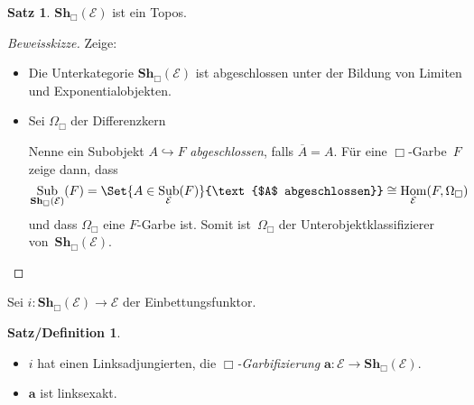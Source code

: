 \documentclass{article}
\theoremstyle{definition}
\newtheorem*{satz}{Satz}
\newtheorem*{satzdefn}{Satz/Definition}
\theoremstyle{remark}
\newcommand{\?}{\,{:}\,}
\renewcommand{\_}{\mathpunct{.}\,}
\DeclareMathOperator{\Hom}{Hom} %
\DeclareMathOperator{\id}{id} %
\DeclareMathOperator{\Sub}{Sub} %
\newcommand{\clos}[1]{\overline{{#1}}} %
\newcommand{\sheafification}{\mathbf{a}} %
\newcommand{\Sh}{\mathbf{Sh}} %
\newcommand{\Eat}{\mathcal{E}} %
\begin{document}
\begin{satz}
  $\Sh_\Box(\Eat)$ ist ein Topos.
\end{satz}

\begin{proof}[Beweisskizze]
  Zeige:
  \begin{itemize}
    \item Die Unterkategorie $\Sh_\Box(\Eat)$ ist abgeschlossen unter der Bildung von Limiten und Exponentialobjekten.
    \item
      Sei $\Omega_\Box$ der Differenzkern


      Nenne ein Subobjekt $A \hookrightarrow F$ \emph{abgeschlossen}, falls $\clos{A} = A$.
      Für eine $\Box$-Garbe~$F$ zeige dann, dass
      \[
        \Sub_{\Sh_\Box(\Eat)}(F) =
        \Set{A \in \Sub_\Eat(F)}{\text{$A$ abgeschlossen}} \cong
        \Hom_\Eat(F, \Omega_\Box)
      \]
      und dass $\Omega_\Box$ eine $F$-Garbe ist.
      Somit ist~$\Omega_\Box$ der Unterobjektklassifizierer von~$\Sh_\Box(\Eat)$. \qedhere
  \end{itemize}
\end{proof}

Sei $i : \Sh_\Box(\Eat) \to \Eat$ der Einbettungsfunktor.

\begin{satzdefn}
  \begin{minipage}[t]{0.99 \linewidth}
    \begin{itemize}
      \item $i$ hat einen Linksadjungierten, die \emph{$\Box$-Garbifizierung} $\sheafification : \Eat \to \Sh_\Box(\Eat)$.
      \item $\sheafification$ ist linksexakt.
    \end{itemize}
  \end{minipage}
\end{satzdefn}
\end{document}
